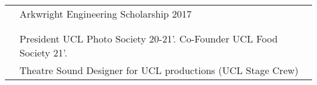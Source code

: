 \documentclass[letterpaper, 11pt]{article}
\begin{document}
\begin{longtable}{p{1.3in}p{4.8in}}

{\color{OliveGreen}{Honours and}} 
& Arkwright Engineering Scholarship \hfill 2017\\
{\color{OliveGreen}{scholarships}} 
& \\
& \\


\nohyphens{\color{OliveGreen}{Other interests}} 
& President UCL Photo Society 20-21'. Co-Founder UCL Food Society 21'.\\ 
& Theatre Sound Designer for UCL productions (UCL Stage Crew)\\


\end{longtable}
\end{document}
